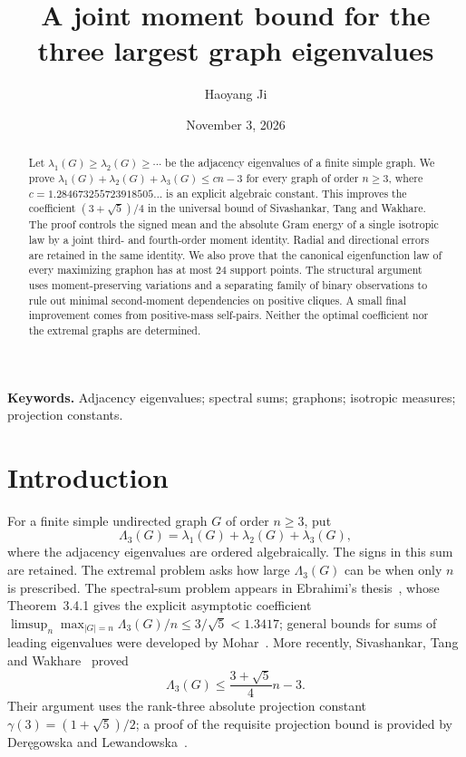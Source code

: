 \documentclass[11pt]{article}
\title{A joint moment bound for the three largest graph eigenvalues}
\author{Haoyang Ji}
\date{November 3, 2026}
\theoremstyle{remark}\newtheorem{remark}[theorem]{Remark}
\numberwithin{equation}{section}
\begin{document}
\maketitle
\begin{abstract}
Let $\lambda_1(G)\ge\lambda_2(G)\ge\cdots$ be the adjacency eigenvalues
of a finite simple graph. We prove
$\lambda_1(G)+\lambda_2(G)+\lambda_3(G)\le cn-3$ for every graph of order
$n\ge3$, where $c=1.284673255723918505\ldots$ is an explicit algebraic
constant. This improves the coefficient $(3+\sqrt5)/4$ in the universal
bound of Sivashankar, Tang and Wakhare. The proof controls the signed
mean and the absolute Gram energy of a single isotropic law by a joint
third- and fourth-order moment identity. Radial and directional errors
are retained in the same identity. We also prove that the canonical
eigenfunction law of every maximizing graphon has at most 24 support
points. The structural argument uses moment-preserving variations and
a separating family of binary observations to rule out minimal
second-moment dependencies on positive cliques. A small final improvement
comes from positive-mass self-pairs. Neither the optimal coefficient nor
the extremal graphs are determined.
\end{abstract}

\noindent\textbf{Keywords.} Adjacency eigenvalues; spectral sums; graphons;
isotropic measures; projection constants.

\section{Introduction}
For a finite simple undirected graph $G$ of order $n\ge3$, put
\[
 \Lambda_3(G)=\lambda_1(G)+\lambda_2(G)+\lambda_3(G),
\]
where the adjacency eigenvalues are ordered algebraically. The signs in
this sum are retained. The extremal problem asks how large $\Lambda_3(G)$
can be when only $n$ is prescribed. The spectral-sum problem appears in Ebrahimi's thesis~\cite{Ebrahimi},
whose Theorem~3.4.1 gives the explicit asymptotic coefficient
$\limsup_n\max_{|G|=n}\Lambda_3(G)/n\le3/\sqrt5<1.3417$;
general bounds for sums of leading eigenvalues were developed by
Mohar~\cite{Mohar}. More recently,
Sivashankar, Tang and Wakhare~\cite[Proposition 6.1]{STW} proved
\begin{equation}\label{stw-bound}
 \Lambda_3(G)\le\frac{3+\sqrt5}{4}n-3.
\end{equation}
Their argument uses the rank-three absolute projection constant
$\gamma(3)=(1+\sqrt5)/2$; a proof of the requisite projection bound is
provided by Der\k{e}gowska and Lewandowska~\cite{DL}.
\end{document}
